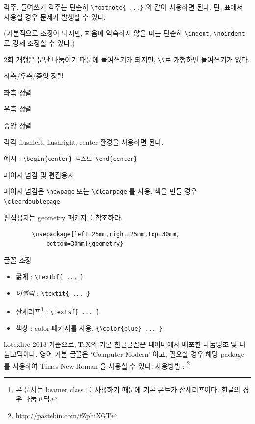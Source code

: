 \documentclass[12pt]{beamer}
\begin{document}
\begin{frame}[fragile]{각주, 들여쓰기}
	각주는 단순히 \verb|\footnote{ ...}| 와 같이 사용하면 된다. 단, 표에서 사용할 
	경우 문제가 발생할 수 있다.
	\vspace{1cm}
	
	(기본적으로 조정이 되지만, 처음에 익숙하지 않을 때는 단순히 
	\verb|\indent|, \verb|\noindent|로 강제 조정할 수 있다.)
	
	2회 개행은 문단 나눔이기 때문에 들여쓰기가 되지만, \verb|\\|로 
	개행하면 들여쓰기가 없다. 
	
\end{frame}
\begin{frame}[fragile]{좌측/우측/중앙 정렬}
	\begin{flushleft}
		좌측 정렬
	\end{flushleft}
	\begin{flushright}
		우측 정렬
	\end{flushright}
	\begin{center}
		중앙 정렬
	\end{center}
	각각 flushleft, flushright, center 환경을 사용하면 된다.
	
	예시 : \verb|\begin{center} 텍스트 \end{center}|
\end{frame}
\begin{frame}[fragile]{페이지 넘김 및 편집용지}
	
	페이지 넘김은 \verb|\newpage| 또는 \verb|\clearpage| 를 사용. 
	책을 만들 경우 \verb|\cleardoublepage|
	\vspace{0.7cm}
	
	편집용지는 geometry 패키지를 참조하라. 
	
	\begin{verbatim}
		\usepackage[left=25mm,right=25mm,top=30mm,
			bottom=30mm]{geometry}
	\end{verbatim}
\end{frame}
\begin{frame}[fragile]{글꼴 조정}
	\begin{itemize}
		\item \textbf{굵게} : \verb|\textbf{ ... }|
		\item \textit{이탤릭} : \verb|\textit{ ... }|
		\item \textsf{산세리프}\footnote{본 문서는 beamer class 를 
		사용하기 때문에 기본 폰트가 산세리프이다. 한글의 경우 
		나눔고딕.} : \verb|\textsf{ ... }|
		\item {\color{blue} 색상} : color 패키지를 사용,
		\verb|{\color{blue} ... }|
	\end{itemize}
	kotexlive 2013 기준으로, \TeX 의 기본 한글글꼴은 네이버에서 배포한 나눔명조 및 나눔고딕이다. 영어 기본 글꼴은 `Computer Modern' 이고, 필요할 경우 해당 package 를 사용하여 Times New Roman 을 사용할 수 있다. 사용방법 : \footnote{\url{http://pastebin.com/fZphiXGT}}
\end{frame}
\end{document}
